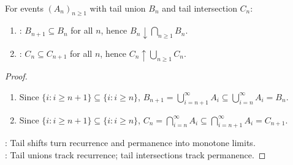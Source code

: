 \begin{proposition} \label{prop:event-limsup-liminf-monotonicity} \\
For events $(A_n)_{n\geq1}$ with tail union $B_n$ and tail intersection $C_n$:
\begin{enumerate}[label=(\roman*)]
\setlength{\itemsep}{0pt}
\item {}: $B_{n+1}\subseteq B_n$ for all $n$, hence $B_n\downarrow\bigcap\limits_{n\geq1}B_n$.
\item {}: $C_n\subseteq C_{n+1}$ for all $n$, hence $C_n\uparrow\bigcup\limits_{n\geq1}C_n$.
\end{enumerate}
\begin{proof}
\begin{enumerate}[label=(\roman*)]
\setlength{\itemsep}{0pt}
\item Since $\{i:i\geq n+1\}\subseteq\{i:i\geq n\}$, $B_{n+1}=\bigcup\limits_{i=n+1}^{\infty}A_i\subseteq\bigcup\limits_{i=n}^{\infty}A_i=B_n$.
\item Since $\{i:i\geq n+1\}\subseteq\{i:i\geq n\}$, $C_n=\bigcap\limits_{i=n}^{\infty}A_i\subseteq\bigcap\limits_{i=n+1}^{\infty}A_i=C_{n+1}$.
\end{enumerate}
: Tail shifts turn recurrence and permanence into monotone limits.\\
: Tail unions track recurrence; tail intersections track permanence.
\end{proof}
\end{proposition}

